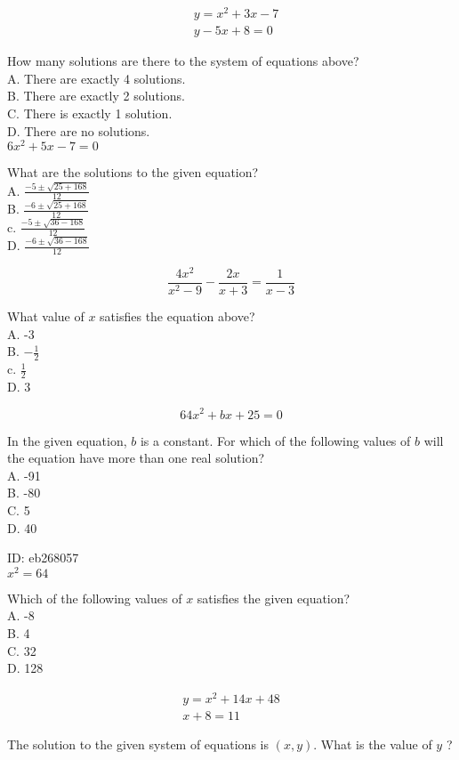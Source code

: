 $$
\begin{aligned}
& y=x^{2}+3 x-7 \\
& y-5 x+8=0
\end{aligned}
$$

How many solutions are there to the system of equations above?\\
A. There are exactly 4 solutions.\\
B. There are exactly 2 solutions.\\
C. There is exactly 1 solution.\\
D. There are no solutions.\\
$6 x^{2}+5 x-7=0$

What are the solutions to the given equation?\\
A. $\frac{-5 \pm \sqrt{25+168}}{12}$\\
B. $\frac{-6 \pm \sqrt{25+168}}{12}$\\
c. $\frac{-5 \pm \sqrt{36-168}}{12}$\\
D. $\frac{-6 \pm \sqrt{36-168}}{12}$

$$
\frac{4 x^{2}}{x^{2}-9}-\frac{2 x}{x+3}=\frac{1}{x-3}
$$

What value of $x$ satisfies the equation above?\\
A. -3\\
B. $-\frac{1}{2}$\\
c. $\frac{1}{2}$\\
D. 3

$$
64 x^{2}+b x+25=0
$$

In the given equation, $b$ is a constant. For which of the following values of $b$ will the equation have more than one real solution?\\
A. -91\\
B. -80\\
C. 5\\
D. 40

ID: eb268057\\
$x^{2}=64$

Which of the following values of $x$ satisfies the given equation?\\
A. -8\\
B. 4\\
C. 32\\
D. 128

$$
\begin{gathered}
y=x^{2}+14 x+48 \\
x+8=11
\end{gathered}
$$

The solution to the given system of equations is $(x, y)$. What is the value of $y$ ?

